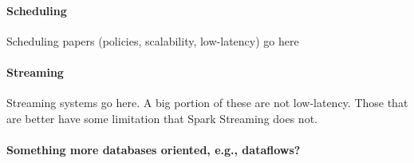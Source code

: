 
\paragraph {\bf Scheduling} Scheduling papers (policies, scalability, low-latency) go here

\paragraph {\bf Streaming} Streaming systems go here. A big portion of these are not low-latency. Those that are better have some limitation that Spark Streaming does not.

\paragraph {\bf Something more databases oriented, e.g., dataflows?}
